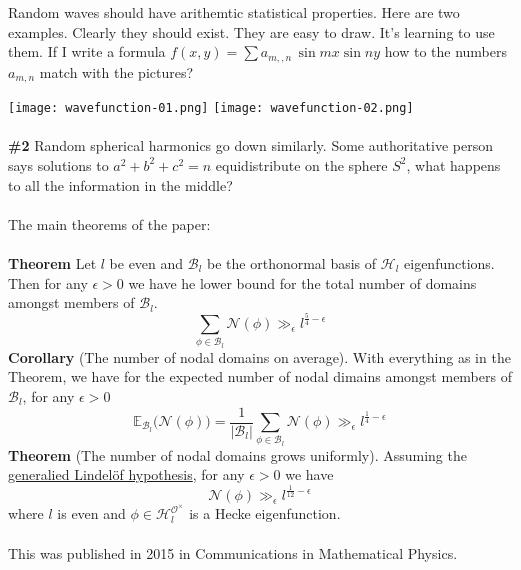\documentclass[12pt]{article}
\begin{document}
\newpage \noindent 
Random waves should have arithemtic statistical properties. Here are two examples.  Clearly they should exist.  They are easy to draw.  It's learning to use them.  If I write a formula $f(x,y) = \sum a_{m,,n} \, \sin mx \sin n y$ how to the numbers $a_{m,n}$ match with the pictures?

\texttt{[image: wavefunction-01.png]}
\texttt{[image: wavefunction-02.png]} \\ \\
\textbf{\#2} Random spherical harmonics go down similarly.  Some authoritative person says solutions to $a^2 + b^2 + c^2 = n$ equidistribute on the sphere $S^2$, what happens to all the information in the middle? \\ \\
The main theorems of the paper: \\ \\
{\textbf{Theorem}} Let $l$ be even and $\mathcal{B}_l$ be the orthonormal basis of $\mathcal{H}_l$ eigenfunctions.  Then for any $\epsilon > 0$ we have he lower bound for the total number of domains amongst members of $\mathcal{B}_l$.
$$ \sum_{\phi \in \mathcal{B}_l } \mathcal{N}(\phi)  \gg_\epsilon l^{\frac{5}{4} - \epsilon} $$
{\textbf{Corollary}} (The number of nodal domains on average).  With everything as in the Theorem, we have for the expected number of nodal dimains amongst members of $\mathcal{B}_l$, for any $\epsilon > 0$ 
$$ \mathbb{E}_{\mathcal{B}_l} \big(  \mathcal{N}(\phi) \big) = 
\frac{1}{|\mathcal{B}_l|} \sum_{\phi \in \mathcal{B}_l} \mathcal{N}(\phi) \gg_\epsilon l^{\frac{1}{4} - \epsilon}  $$
{\textbf{Theorem}} (The number of nodal domains grows uniformly).  Assuming the \underline{generalied Lindel\"{o}f hypothesis}, for any $\epsilon > 0$ we have
$$ \mathcal{N}(\phi) \gg_\epsilon l^{\frac{1}{12} - \epsilon} $$
where $l$ is even and $\phi \in \mathcal{H}_l^{\mathcal{O}^\times}$ is a Hecke eigenfunction. \\ \\
This was published in 2015 in Communications in Mathematical Physics.
\end{document}
